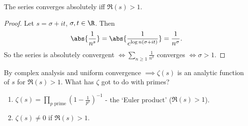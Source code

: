 \documentclass{article}
\begin{document}
\begin{nprop}\label{prop:5.3}
    The series converges absolutely iff $\Re(s) > 1$.
\end{nprop}

\begin{proof}
    Let $s = \sigma + i t$, $\sigma,t \in \R$.  Then
    \begin{equation*}
        \abs{\frac{1}{n^s}} = \abs{\frac{1}{e^{\log n (\sigma + i t)}}} = \frac{1}{n^\sigma}.
    \end{equation*}
    So the series is absolutely convergent $\iff \sum_{n \geq 1} \frac{1}{n^\sigma}$ converges $\iff \sigma > 1$.
\end{proof}

By complex analysis and uniform convergence $\implies \zeta(s)$ is an analytic function of $s$ for $\Re(s) > 1$.
What has $\zeta$ got to do with primes?

\begin{nthm}\label{thm:5.4}\leavevmode
    \begin{enumerate}[label=(\roman*)]
        \item $\zeta(s) = \prod_{p \text{ prime}} (1 - \frac{1}{p^s})^{-1}$ - the `Euler product' ($\Re(s) > 1$).
        \item $\zeta(s) \neq 0$ if $\Re(s) > 1$.
    \end{enumerate}
\end{nthm}

\end{document}
